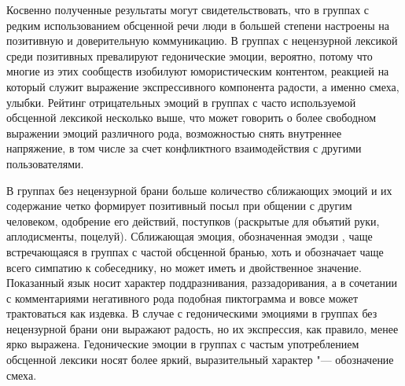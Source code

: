 Косвенно полученные результаты могут свидетельствовать, что в группах с редким использованием обсценной речи люди в большей степени настроены на позитивную и доверительную коммуникацию. В группах с нецензурной лексикой среди позитивных превалируют гедонические эмоции, вероятно, потому что многие из этих сообществ изобилуют юмористическим контентом, реакцией на который служит выражение экспрессивного компонента радости, а именно смеха, улыбки. Рейтинг отрицательных эмоций в группах с часто используемой обсценной лексикой несколько выше, что может говорить о более свободном выражении эмоций различного рода, возможностью снять внутреннее напряжение, в том числе за счет конфликтного взаимодействия с другими пользователями.

В группах без нецензурной брани больше количество сближающих эмоций и их содержание четко формирует позитивный посыл при общении с другим человеком, одобрение его действий, поступков (раскрытые для объятий руки, аплодисменты, поцелуй). Сближающая эмоция, обозначенная эмодзи \facesavoringfood, чаще встречающаяся в группах с частой обсценной бранью, хоть и обозначает чаще всего симпатию к собеседнику, но может иметь и двойственное значение. Показанный язык носит характер поддразнивания, раззадоривания, а в сочетании с комментариями негативного рода подобная пиктограмма и вовсе может трактоваться как издевка. В случае с гедоническими эмоциями в группах без нецензурной брани они выражают радость, но их экспрессия, как правило, менее ярко выражена. Гедонические эмоции в группах с частым употреблением обсценной лексики носят более яркий, выразительный характер "--- обозначение смеха.

